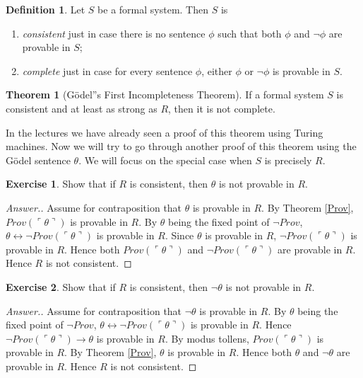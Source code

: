 \documentclass[11pt]{article}
\theoremstyle{definition}
\newtheorem{defn}{Definition}
\newtheorem{exer}{Exercise}
\newtheorem{theorem}{Theorem}[section]
\begin{document}
\begin{defn} \label{ConsistentComplete}
Let $S$ be a formal system. Then $S$ is
\begin{enumerate}
\item \textit{consistent} just in case there is no sentence $\phi$ such that both $\phi$ and $\neg \phi$ are provable in $S$;
\item \textit{complete} just in case for every sentence $\phi$, either $\phi$ or $\neg \phi$ is provable in $S$.
\end{enumerate}
\end{defn}

\begin{theorem}[G\"odel''s First Incompleteness Theorem] If a formal system $S$ is consistent and at least as strong as $R$, then it is not complete.
\end{theorem}

In the lectures we have already seen a proof of this theorem using Turing machines. Now we will try to go through another proof of this theorem using the G\"odel sentence $\theta$. We will focus on the special case when $S$ is precisely $R$.

\begin{exer} \label{Exer}
Show that if $R$ is consistent, then $\theta$ is not provable in $R$.
\end{exer}

\begin{proof}[Answer.]
Assume for contraposition that $\theta$ is provable in $R$. By Theorem \ref{Prov}, $Prov(\ulcorner \theta \urcorner)$ is provable in $R$. By $\theta$ being the fixed point of $\neg Prov$, $\theta \leftrightarrow \neg Prov (\ulcorner \theta \urcorner)$ is provable in $R$. Since $\theta$ is provable in $R$, $\neg Prov (\ulcorner \theta \urcorner)$ is provable in $R$. Hence both $Prov(\ulcorner \theta \urcorner)$ and $\neg Prov(\ulcorner \theta \urcorner)$ are provable in $R$. Hence $R$ is not consistent.

\end{proof}

\begin{exer}
Show that if $R$ is consistent, then $\neg \theta$ is not provable in $R$.
\end{exer}

\begin{proof}[Answer.]
Assume for contraposition that $\neg \theta$ is provable in $R$. By $\theta$ being the fixed point of $\neg Prov$, $\theta \leftrightarrow \neg Prov (\ulcorner \theta \urcorner)$ is provable in $R$. Hence $\neg Prov (\ulcorner \theta \urcorner) \rightarrow \theta$ is provable in $R$. By modus tollens, $Prov (\ulcorner \theta \urcorner)$ is provable in $R$. By Theorem \ref{Prov}, $\theta$ is provable in $R$. Hence both $\theta$ and $\neg \theta$ are provable in $R$. Hence $R$ is not consistent.

\end{proof}
\end{document}

